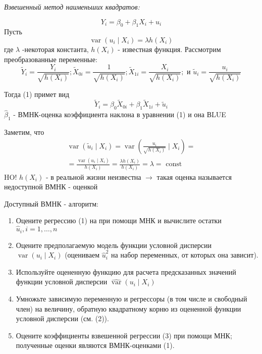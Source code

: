 \documentclass[a4paper,8pt]{article} %
\begin{document}
%
%

\textit{Взвешенный метод наименьших квадратов: }

$$
Y_{i}=\beta_{0}+\beta_{1} X_{i}+u_{i}
$$
Пусть
$$
\operatorname{var}\left(u_{i} \mid X_{i}\right)=\lambda h\left(X_{i}\right)
$$
где $\lambda$ -некоторая константа, $h\left(X_{i}\right)$ - известная функция.
Рассмотрим преобразованные переменные:
$$
\tilde{Y}_{i}=\frac{Y_{i}}{\sqrt{h\left(X_{i}\right)}} ; \tilde{X}_{0 i}=\frac{1}{\sqrt{h\left(X_{i}\right)}} ; \tilde{X}_{1 i}=\frac{X_{i}}{\sqrt{h\left(X_{i}\right)}} ; \text { и } \tilde{u}_{i}=\frac{u_{i}}{\sqrt{h\left(X_{i}\right)}}
$$

Тогда (1) примет вид
$$
\tilde{Y}_{i}=\beta_{0} \tilde{X}_{0 i}+\beta_{1} \tilde{X}_{1 i}+\tilde{u}_{i}
$$
$\hat{\beta}_{1}$ - ВМНК-оценка коэффициента наклона в уравнении (1) и она ВLUE

Заметим, что
$$
\begin{array}{l}
\operatorname{var}\left(\tilde{u}_{i} \mid X_{i}\right)=\operatorname{var}\left(\frac{u_{i}}{\sqrt{h\left(X_{i}\right)}} \mid X_{i}\right)= \\
=\frac{\operatorname{var}\left(u_{i} \mid X_{i}\right)}{h\left(X_{i}\right)}=\frac{\lambda h\left(X_{i}\right)}{h\left(X_{i}\right)}=\lambda=\text { const }
\end{array}
$$
HO!
$h\left(X_{i}\right)$ - в реальной жизни неизвестна $\rightarrow$ такая оценка называется недоступной ВМНК - оценкой


Доступный ВМНК - алгоритм: 

\begin{enumerate}
	\item Оцените регрессию (1) на при помощи МНК и вычислите остатки $\hat{u}_{i}, i=1, \ldots, n$
\item  Оцените предполагаемую модель функции условной дисперсии $\operatorname{var}\left(u_{i} \mid X_{i}\right)$ (оцениваем $\hat{u}_{i}^{2}$ на набор переменных, от которых она зависит).
\item  Используйте оцененную функцию для расчета предсказанных значений функции условной дисперсии $\widehat{\operatorname{var}}\left(u_{i} \mid X_{i}\right)$
\item  Умножьте зависимую переменную и регрессоры (в том числе и свободный член) на величину, обратную квадратному корню из оцененной функции условной дисперсии (см. (2)).
\item  Оцените коэффициенты взвешенной регрессии (3) при помощи МНК; полученные оценки являются ВМНК-оценками (1).
\end{enumerate}
\end{document}
